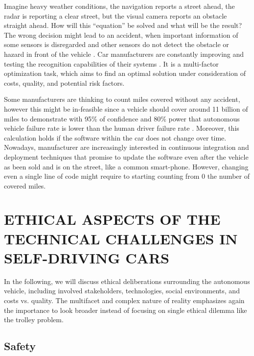 Imagine heavy weather conditions, the navigation reports a street ahead, the radar is reporting a clear street, but the visual camera reports an obstacle straight ahead. How will this “equation” be solved and what will be the result? The wrong decision might lead to an accident, when important information of some sensors is disregarded and other sensors do not detect the obstacle or hazard in front of the vehicle \cite{Tesla2016_tragicloss}. Car manufacturers are constantly improving and testing the recognition capabilities of their systems \cite{Tesla2016_upgrade}. It is a multi-factor optimization task, which aims to find an optimal solution under consideration of costs, quality, and potential risk factors.

Some manufacturers are thinking to count miles covered without any accident, however this might be in-feasible since a vehicle should cover around 11 billion of miles to demonstrate with 95\% of confidence and 80\% power that autonomous vehicle failure rate is lower than the human driver failure rate \cite{KALRA2016182}. Moreover, this calculation holds if the software within the car does not change over time. Nowadays, manufacturer are increasingly interested in continuous integration and deployment techniques that promise to update the software even after the vehicle as been sold and is on the street, like a common smart-phone. However, changing even a single line of code might require to starting counting from 0 the number of covered miles.


\section{ETHICAL ASPECTS OF THE TECHNICAL CHALLENGES IN SELF-DRIVING CARS}
\label{sec:EAofTC}

In the following, we will discuss ethical deliberations surrounding the autonomous vehicle, including involved stakeholders, technologies, social environments, and costs vs. quality. The multifacet and complex nature of reality emphasizes again the importance to look broader instead of focusing on single ethical dilemma like the trolley problem.

\subsection{Safety}
\label{sec:EAofTC:Safety}

